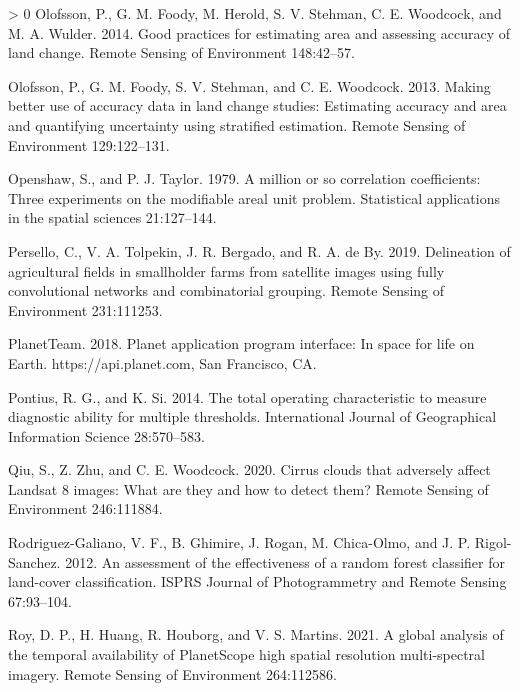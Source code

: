 \documentclass[11pt,a4paper]{article}
\newlength{\cslhangindent}
\newenvironment{CSLReferences}[3] %
 {%
  \setlength{\parindent}{0pt}
  \ifodd #1 \everypar{\setlength{\hangindent}{\cslhangindent}}\ignorespaces\fi
  \ifnum #2 > 0
  \setlength{\parskip}{#2\baselineskip}
  \fi
 }%
 {}
\begin{document}
\begin{CSLReferences}{1}{0}
\leavevmode\hypertarget{ref-OlofssonGoodpracticesestimating2014}{}%
Olofsson, P., G. M. Foody, M. Herold, S. V. Stehman, C. E. Woodcock, and
M. A. Wulder. 2014. Good practices for estimating area and assessing
accuracy of land change. Remote Sensing of Environment 148:42--57.

\leavevmode\hypertarget{ref-OlofssonMakingbetteruse2013}{}%
Olofsson, P., G. M. Foody, S. V. Stehman, and C. E. Woodcock. 2013.
Making better use of accuracy data in land change studies: Estimating
accuracy and area and quantifying uncertainty using stratified
estimation. Remote Sensing of Environment 129:122--131.

\leavevmode\hypertarget{ref-Openshawmillioncorrelationcoefficients1979}{}%
Openshaw, S., and P. J. Taylor. 1979. A million or so correlation
coefficients: Three experiments on the modifiable areal unit problem.
Statistical applications in the spatial sciences 21:127--144.

\leavevmode\hypertarget{ref-perselloDelineationAgriculturalFields2019}{}%
Persello, C., V. A. Tolpekin, J. R. Bergado, and R. A. de By. 2019.
Delineation of agricultural fields in smallholder farms from satellite
images using fully convolutional networks and combinatorial grouping.
Remote Sensing of Environment 231:111253.

\leavevmode\hypertarget{ref-planetteamPlanetApplicationProgram2018}{}%
PlanetTeam. 2018. Planet application program interface: In space for
life on {Earth}. {https://api.planet.com}, {San Francisco, CA}.

\leavevmode\hypertarget{ref-Pontiustotaloperatingcharacteristic2014}{}%
Pontius, R. G., and K. Si. 2014. The total operating characteristic to
measure diagnostic ability for multiple thresholds. International
Journal of Geographical Information Science 28:570--583.

\leavevmode\hypertarget{ref-qiuCirrusCloudsThat2020}{}%
Qiu, S., Z. Zhu, and C. E. Woodcock. 2020. Cirrus clouds that adversely
affect {Landsat} 8 images: What are they and how to detect them? Remote
Sensing of Environment 246:111884.

\leavevmode\hypertarget{ref-rodriguez-galianoAssessmentEffectivenessRandom2012}{}%
Rodriguez-Galiano, V. F., B. Ghimire, J. Rogan, M. Chica-Olmo, and J. P.
Rigol-Sanchez. 2012. An assessment of the effectiveness of a random
forest classifier for land-cover classification. ISPRS Journal of
Photogrammetry and Remote Sensing 67:93--104.

\leavevmode\hypertarget{ref-royGlobalAnalysisTemporal2021}{}%
Roy, D. P., H. Huang, R. Houborg, and V. S. Martins. 2021. A global
analysis of the temporal availability of {PlanetScope} high spatial
resolution multi-spectral imagery. Remote Sensing of Environment
264:112586.


\end{CSLReferences}
\end{document}
